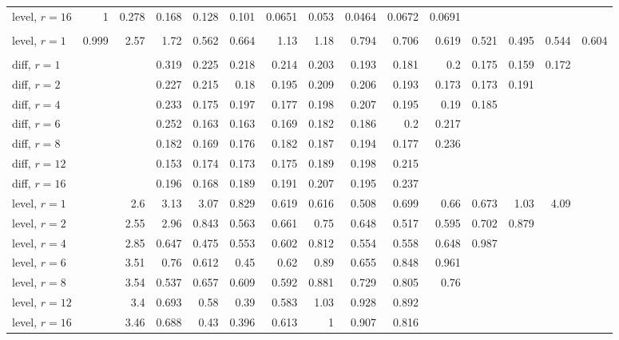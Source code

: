 \begin{table}[t]
\begin{tabular}{lrrrrrrrrrrrrrr}
\quad level, $r{=}16$ & 1 & 0.278 & 0.168 & 0.128 & 0.101 & 0.0651 & 0.053 & 0.0464 & 0.0672 & 0.0691 &  &  &  &  \\
\addlinespace
\multicolumn{15}{l}{\textit{Chronos-2 S (level)}} \\
\quad level, $r{=}1$ & 0.999 & 2.57 & 1.72 & 0.562 & 0.664 & 1.13 & 1.18 & 0.794 & 0.706 & 0.619 & 0.521 & 0.495 & 0.544 & 0.604 \\
\addlinespace
\multicolumn{15}{l}{\textit{Moirai}} \\
\quad diff, $r{=}1$ &  &  & 0.319 & 0.225 & 0.218 & 0.214 & 0.203 & 0.193 & 0.181 & 0.2 & 0.175 & 0.159 & 0.172 &  \\
\quad diff, $r{=}2$ &  &  & 0.227 & 0.215 & 0.18 & 0.195 & 0.209 & 0.206 & 0.193 & 0.173 & 0.173 & 0.191 &  &  \\
\quad diff, $r{=}4$ &  &  & 0.233 & 0.175 & 0.197 & 0.177 & 0.198 & 0.207 & 0.195 & 0.19 & 0.185 &  &  &  \\
\quad diff, $r{=}6$ &  &  & 0.252 & 0.163 & 0.163 & 0.169 & 0.182 & 0.186 & 0.2 & 0.217 &  &  &  &  \\
\quad diff, $r{=}8$ &  &  & 0.182 & 0.169 & 0.176 & 0.182 & 0.187 & 0.194 & 0.177 & 0.236 &  &  &  &  \\
\quad diff, $r{=}12$ &  &  & 0.153 & 0.174 & 0.173 & 0.175 & 0.189 & 0.198 & 0.215 &  &  &  &  &  \\
\quad diff, $r{=}16$ &  &  & 0.196 & 0.168 & 0.189 & 0.191 & 0.207 & 0.195 & 0.237 &  &  &  &  &  \\
\quad level, $r{=}1$ &  & 2.6 & 3.13 & 3.07 & 0.829 & 0.619 & 0.616 & 0.508 & 0.699 & 0.66 & 0.673 & 1.03 & 4.09 &  \\
\quad level, $r{=}2$ &  & 2.55 & 2.96 & 0.843 & 0.563 & 0.661 & 0.75 & 0.648 & 0.517 & 0.595 & 0.702 & 0.879 &  &  \\
\quad level, $r{=}4$ &  & 2.85 & 0.647 & 0.475 & 0.553 & 0.602 & 0.812 & 0.554 & 0.558 & 0.648 & 0.987 &  &  &  \\
\quad level, $r{=}6$ &  & 3.51 & 0.76 & 0.612 & 0.45 & 0.62 & 0.89 & 0.655 & 0.848 & 0.961 &  &  &  &  \\
\quad level, $r{=}8$ &  & 3.54 & 0.537 & 0.657 & 0.609 & 0.592 & 0.881 & 0.729 & 0.805 & 0.76 &  &  &  &  \\
\quad level, $r{=}12$ &  & 3.4 & 0.693 & 0.58 & 0.39 & 0.583 & 1.03 & 0.928 & 0.892 &  &  &  &  &  \\
\quad level, $r{=}16$ &  & 3.46 & 0.688 & 0.43 & 0.396 & 0.613 & 1 & 0.907 & 0.816 &  &  &  &  &  \\

\end{tabular}
\end{table}
